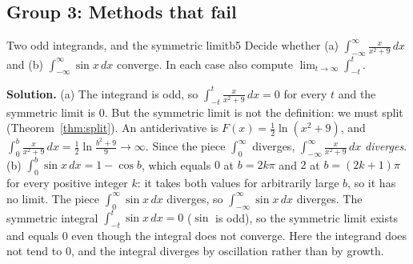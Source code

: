 \documentclass[11pt]{article}
\begin{document}
\subsection*{Group 3: Methods that fail}

\begin{exmp}{Two odd integrands, and the symmetric limit}{b5}
Decide whether (a) $\displaystyle\int_{-\infty}^\infty\frac x{x^2+9}\,dx$ and (b) $\displaystyle\int_{-\infty}^\infty\sin x\,dx$ converge. In each case also compute $\lim_{t\to\infty}\int_{-t}^t$.

\textbf{Solution.} (a) The integrand is odd, so $\int_{-t}^t\frac x{x^2+9}\,dx=0$ for every $t$ and the symmetric limit is $0$. But the symmetric limit is not the definition: we must split (Theorem~\ref{thm:split}). An antiderivative is $F(x)=\frac12\ln\left(x^2+9\right)$, and $\int_0^b\frac x{x^2+9}\,dx=\frac12\ln\frac{b^2+9}9\to\infty$. Since the piece $\int_0^\infty$ diverges, $\int_{-\infty}^\infty\frac x{x^2+9}\,dx$ \emph{diverges}.
(b) $\int_0^b\sin x\,dx=1-\cos b$, which equals $0$ at $b=2k\pi$ and $2$ at $b=(2k+1)\pi$ for every positive integer $k$: it takes both values for arbitrarily large $b$, so it has no limit. The piece $\int_0^\infty\sin x\,dx$ diverges, so $\int_{-\infty}^\infty\sin x\,dx$ diverges. The symmetric integral $\int_{-t}^t\sin x\,dx=0$ ($\sin$ is odd), so the symmetric limit exists and equals $0$ even though the integral does not converge. Here the integrand does not tend to $0$, and the integral diverges by oscillation rather than by growth.
\end{exmp}
\end{document}
